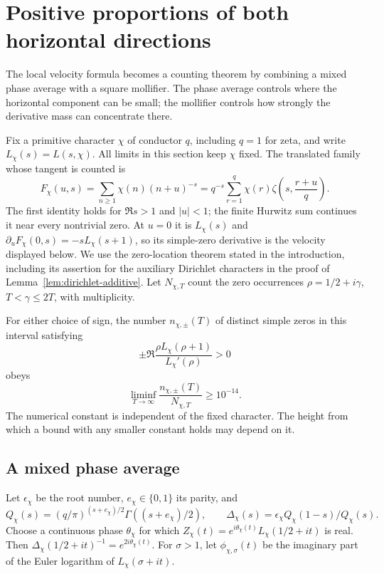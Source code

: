 \section{Positive proportions of both horizontal directions}
\label{sec:signed-density}
The local velocity formula becomes a counting theorem by combining a
mixed phase average with a square mollifier. The phase average controls
where the horizontal component can be small; the mollifier controls
how strongly the derivative mass can concentrate there.

Fix a primitive character $\chi$ of conductor $q$, including $q=1$ for
zeta, and write $L_\chi(s)=L(s,\chi)$. All limits in this section keep
$\chi$ fixed. The translated family whose tangent is counted is
\[
 F_\chi(u,s)=\sum_{n\ge1}\chi(n)(n+u)^{-s}
 =q^{-s}\sum_{r=1}^q\chi(r)\zeta\left(s,\frac{r+u}{q}\right).
\]
The first identity holds for $\Re s>1$ and $|u|<1$; the finite
Hurwitz sum continues it near every nontrivial zero. At $u=0$ it
is $L_\chi(s)$ and $\partial_uF_\chi(0,s)=-sL_\chi(s+1)$,
so its simple-zero derivative is the velocity displayed below.
We use the zero-location theorem stated in the introduction,
including its assertion for the auxiliary Dirichlet characters in the
proof of Lemma~\ref{lem:dirichlet-additive}. Let $N_{\chi,T}$ count the
zero occurrences $\rho=1/2+i\gamma$, $T<\gamma\le2T$, with multiplicity.

\begin{theorem}\label{thm:positive-directions}
For either choice of sign, the number $n_{\chi,\pm}(T)$ of distinct
simple zeros in this interval satisfying
\[
 \pm\Re\frac{\rho L_\chi(\rho+1)}{L_\chi'(\rho)}>0
\]
obeys
\[
 \liminf_{T\to\infty}\frac{n_{\chi,\pm}(T)}{N_{\chi,T}}
       \ge10^{-14}.
\]
The numerical constant is independent of the fixed character. The height
from which a bound with any smaller constant holds may depend on it.
\end{theorem}

\subsection{A mixed phase average}
Let $\epsilon_\chi$ be the root number, $e_\chi\in\{0,1\}$ its parity,
and
\[
 Q_\chi(s)=(q/\pi)^{(s+e_\chi)/2}\Gamma((s+e_\chi)/2),\qquad
 \Delta_\chi(s)=\epsilon_\chi Q_\chi(1-s)/Q_\chi(s).
\]
Choose a continuous phase $\theta_\chi$ for which
$Z_\chi(t)=e^{i\theta_\chi(t)}L_\chi(1/2+it)$ is real. Then
$\Delta_\chi(1/2+it)^{-1}=e^{2i\theta_\chi(t)}$.
For $\sigma>1$, let $\phi_{\chi,\sigma}(t)$ be the imaginary part
of the Euler logarithm of $L_\chi(\sigma+it)$.

